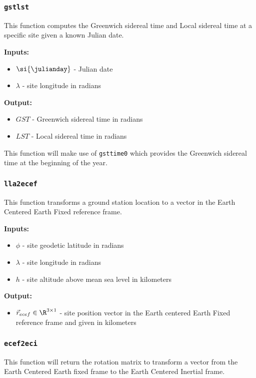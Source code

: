 \documentclass[11pt, reqno]{article}    %
\begin{document}
\subsubsection*{\texttt{gstlst}}

This function computes the Greenwich sidereal time and Local sidereal time at a specific site given a known Julian date.

\noindent \textbf{Inputs: }
\begin{itemize}
    \item \( \si{\julianday} \) - Julian date
    \item \( \lambda \) - site longitude in radians
\end{itemize}

\noindent \textbf{Output:}
\begin{itemize}
    \item \(GST \) - Greenwich sidereal time in radians
    \item \(LST\) - Local sidereal time in radians
\end{itemize}

This function will make use of \texttt{gsttime0} which provides the Greenwich sidereal time at the beginning of the year. 

\subsubsection*{\texttt{lla2ecef}}
This function transforms a ground station location to a vector in the Earth Centered Earth Fixed reference frame.

\noindent \textbf{Inputs: }
\begin{itemize}
    \item \( \phi \) - site geodetic latitude in radians
    \item \( \lambda \) - site longitude in radians
    \item \( h \) - site altitude above mean sea level in kilometers
\end{itemize}

\noindent \textbf{Output:}
\begin{itemize}
    \item \( \vec r_{ecef} \in \R^{3 \times 1} \) - site position vector in the Earth centered Earth Fixed reference frame and given in kilometers
\end{itemize}

\subsubsection*{\texttt{ecef2eci}}
This function will return the rotation matrix to transform a vector from the Earth Centered Earth fixed frame to the Earth Centered Inertial frame.
\end{document}
